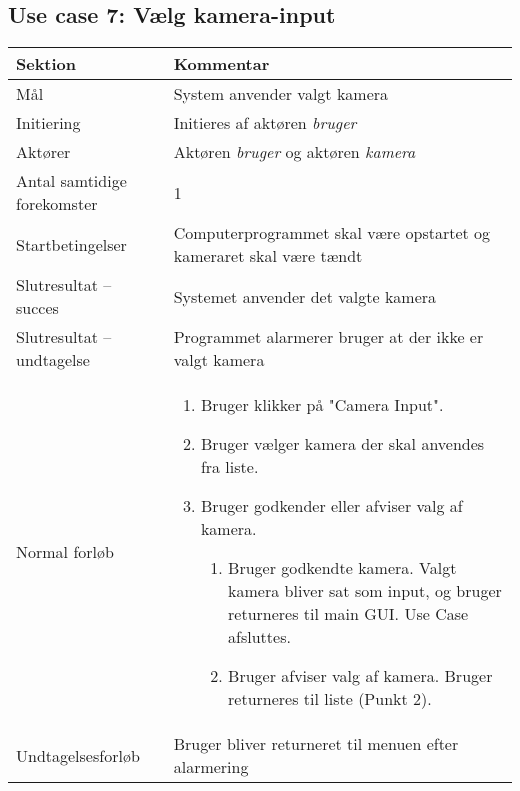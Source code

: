 \documentclass[a4paper,oneside,12pt]{article}
\begin{document}
	\subsection{Use case 7: Vælg kamera-input}
	\begin{tabular}{|l|p{7.7cm}|}
		\hline \textbf{Sektion} 	& \textbf{Kommentar} \\ 
		\hline Mål  & System anvender valgt kamera \\ 
		\hline Initiering  & Initieres af aktøren \textit{bruger} \\ 
		\hline Aktører & Aktøren \textit{bruger} og aktøren \textit{kamera} \\ 
		\hline Antal samtidige forekomster & 1 \\ 
		\hline Startbetingelser & Computerprogrammet skal være opstartet og kameraret skal være tændt  \\ 
		\hline Slutresultat – succes & Systemet anvender det valgte kamera \\ 
		\hline Slutresultat – undtagelse & Programmet alarmerer bruger at der ikke er valgt kamera \\ 
		\hline Normal forløb & \begin{enumerate}
			\item Bruger klikker på "Camera Input".
			\item Bruger vælger kamera der skal anvendes fra liste.
			\item Bruger godkender eller afviser valg af kamera.
			\begin{enumerate}
			\item Bruger godkendte kamera. Valgt kamera bliver sat som input, og bruger returneres til main GUI. Use Case afsluttes.
			\item Bruger afviser valg af kamera. Bruger returneres til liste (Punkt 2).
			\end{enumerate}
		\end{enumerate} \\ 
		\hline Undtagelsesforløb & Bruger bliver returneret til menuen efter alarmering \\ 
		\hline 
	\end{tabular}
	
\end{document}
